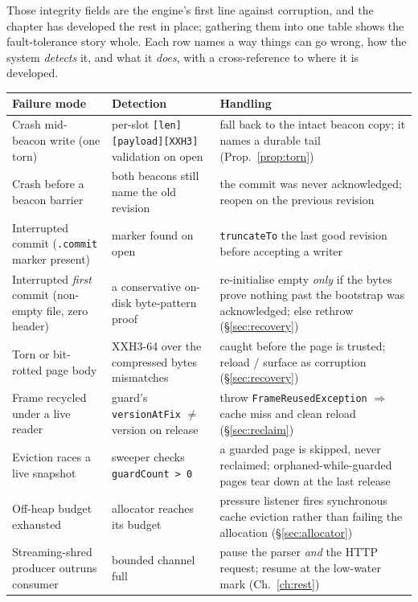 \documentclass[11pt,a4paper,oneside]{report}
\theoremstyle{sirixthm}
\newcommand{\code}[1]{\texttt{#1}}
\begin{document}
Those integrity fields are the engine's first line against corruption, and the chapter has developed the
rest in place; gathering them into one table shows the fault-tolerance story whole. Each row names a way
things can go wrong, how the system \emph{detects} it, and what it \emph{does}, with a cross-reference to
where it is developed.

{\small
\begin{xltabular}{\linewidth}{@{}>{\RaggedRight\arraybackslash}p{0.235\textwidth} >{\RaggedRight\arraybackslash}p{0.25\textwidth} >{\RaggedRight\arraybackslash}X@{}}
\toprule
\textbf{Failure mode} & \textbf{Detection} & \textbf{Handling}\\
\midrule
\endhead
Crash mid-beacon write (one torn) & per-slot \code{[len][payload][XXH3]} validation on open & fall back to the intact beacon copy; it names a durable tail (Prop.~\ref{prop:torn})\\
Crash before a beacon barrier & both beacons still name the old revision & the commit was never acknowledged; reopen on the previous revision\\
Interrupted commit (\code{.commit} marker present) & marker found on open & \code{truncateTo} the last good revision before accepting a writer\\
Interrupted \emph{first} commit (non-empty file, zero header) & a conservative on-disk byte-pattern proof & re-initialise empty \emph{only} if the bytes prove nothing past the bootstrap was acknowledged; else rethrow (\S\ref{sec:recovery})\\
Torn or bit-rotted page body & XXH3-64 over the compressed bytes mismatches & caught before the page is trusted; reload / surface as corruption (\S\ref{sec:recovery})\\
Frame recycled under a live reader & guard's \code{versionAtFix} $\neq$ version on release & throw \code{FrameReusedException} $\Rightarrow$ cache miss and clean reload (\S\ref{sec:reclaim})\\
Eviction races a live snapshot & sweeper checks \code{guardCount > 0} & a guarded page is skipped, never reclaimed; orphaned-while-guarded pages tear down at the last release\\
Off-heap budget exhausted & allocator reaches its budget & pressure listener fires synchronous cache eviction rather than failing the allocation (\S\ref{sec:allocator})\\
Streaming-shred producer outruns consumer & bounded channel full & pause the parser \emph{and} the HTTP request; resume at the low-water mark (Ch.~\ref{ch:rest})\\

\end{xltabular}}
\end{document}
